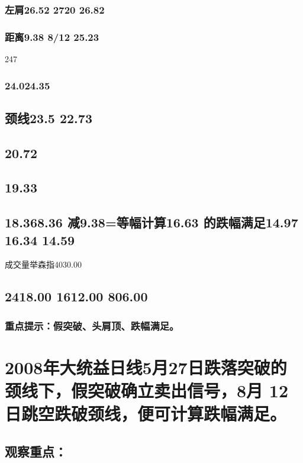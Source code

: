 \documentclass{article}
\begin{document}
\subsubsection{左肩26.52 2720 26.82}

\subsubsection{距离9.38 8/12 25.23}

247

\subsubsection{24.024.35}

\subsection{颈线23.5 22.73}

\subsection{20.72}

\subsection{19.33}

\subsection{18.368.36 减9.38=等幅计算16.63 的跌幅满足14.97 16.34 14.59}

成交量举森指4030.00

\subsection{2418.00 1612.00 806.00}

\subsubsection{重点提示：假突破、头肩顶、跌幅满足。}

\section{2008年大统益日线5月27日跌落突破的颈线下，假突破确立卖出信号，8月 12日跳空跌破颈线，便可计算跌幅满足。}

\subsection{观察重点：}
\end{document}
